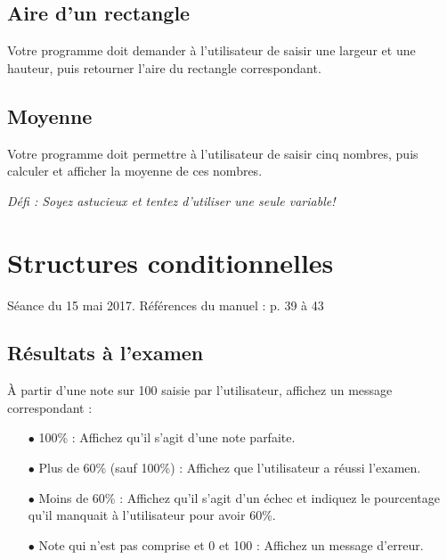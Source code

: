 \documentclass[12pt]{article}
\begin{document}
%
%
%

\subsection{Aire d'un rectangle}

Votre programme doit demander à l'utilisateur de saisir une largeur et une hauteur, puis retourner l'aire du rectangle correspondant.

%
%
%
%

\subsection{Moyenne}

Votre programme doit permettre à l’utilisateur de saisir cinq nombres, puis calculer et afficher la moyenne de ces nombres.

\textit{Défi : Soyez astucieux et tentez d'utiliser une seule variable!}




%
%

\section{Structures conditionnelles}
\vspace*{-\baselineskip}
Séance du 15 mai 2017. Références du manuel : p. 39 à 43

\subsection{Résultats à l'examen}

À partir d'une note sur 100 saisie par l'utilisateur, affichez un message correspondant :

\begin{itemize}
	\item[$\bullet$] 100\% : Affichez qu'il s'agit d'une note parfaite.
	\item[$\bullet$] Plus de 60\% (sauf 100\%) : Affichez que l'utilisateur a réussi l'examen.
	\item[$\bullet$] Moins de 60\% : Affichez qu'il s'agit d'un échec et indiquez le pourcentage qu'il manquait à l'utilisateur pour avoir 60\%.
	\item[$\bullet$] Note qui n'est pas comprise et 0 et 100 : Affichez un message d'erreur.
\end{itemize}
\end{document}
